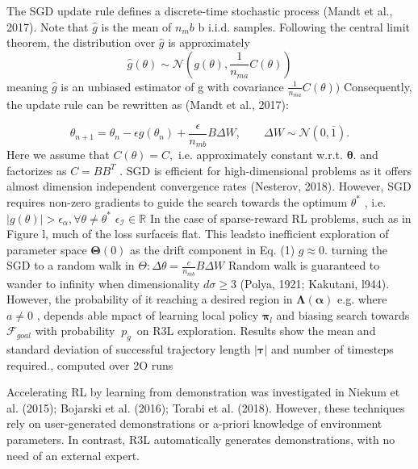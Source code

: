 \documentclass{article}
\begin{document}
The SGD update rule defines a discrete-time stochastic process (Mandt et al., 2017). Note that  ${\hat{g}} $ is the mean of $n _mb$ b i.i.d. samples. Following the central limit theorem, the distribution over ${\hat{g}} $ is
approximately 
$$
{\hat{g}}(\theta)\sim{\mathcal{N}}(g(\theta),{\frac{1}{n_{m a}}}C(\theta)) 
$$
meaning  ${\hat{g}} $ is an unbiased estimator of g with covariance ${\frac{1}{n_{m a}}}C(\theta))$ Consequently, the update rule can be rewritten as (Mandt et al., 2017):

$$
\theta_{n+1}=\theta_{n}-\epsilon g(\theta_{n})+\frac{\epsilon}{n_{m b}}B\Delta W,\qquad\Delta W\sim\mathcal{N}(0,\bar{1}). 
$$
Here we assume that  $C(\theta)=C,$ i.e. approximately constant w.r.t. ${\boldsymbol{\theta}}.$ and factorizes as $C=B B^{T}$ 
.
SGD is efficient for high-dimensional problems as it offers almost dimension independent convergence
rates (Nesterov, 2018). However, SGD requires non-zero gradients to guide the search towards the
optimum $\theta^{*}$ , i.e. $|g(\theta)|>\epsilon_{\alpha},\forall\theta\ne\theta^{*}$  $\epsilon_{\mathcal{I}}\in\mathbb{R}$ In the case of sparse-reward RL problems, such as in Figure l, much of the loss surfaceis flat. This leadsto inefficient exploration of parameter space $\mathbf{\Theta}(0)$ as the drift component in Eq. (1) $g\approx0.$  turning the SGD to a random walk in $\Theta\colon\Delta\theta={\frac{e}{n_{m b}}}B\Delta W$ Random walk is guaranteed to wander to infinity when dimensionality $d\sigma\geq3$ (Polya, 1921; Kakutani, l944). However, the probability of it reaching a desired region in $\mathbf{\Lambda}(\mathbf{\alpha})$  e.g. where $a\neq0$ , depends
able mpact of learning local policy ${\boldsymbol{\pi}}_{l}$ and biasing search towards $\mathcal{F}_{g o a l}$ with probability $\ p_{g}\,$ on R3L exploration. Results show the mean and standard deviation of successful trajectory length $\left|{\boldsymbol{\tau}}\right|$ and number of timesteps required., computed over 2O runs


Accelerating RL by learning from demonstration was investigated in Niekum et al. (2015); Bojarski
et al. (2016); Torabi et al. (2018). However, these techniques rely on user-generated demonstrations or a-priori knowledge of environment parameters. In contrast, R3L automatically generates
demonstrations, with no need of an external expert.
\end{document}
